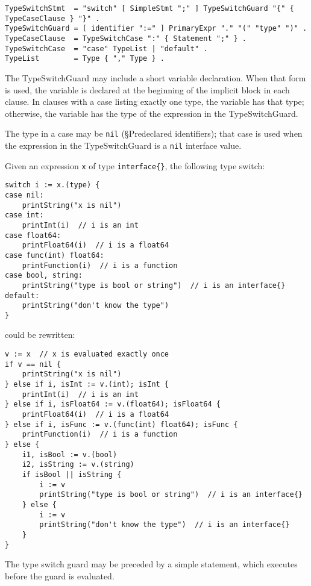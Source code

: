 {\begin{Verbatim}[frame=single]
TypeSwitchStmt  = "switch" [ SimpleStmt ";" ] TypeSwitchGuard "{" { TypeCaseClause } "}" .
TypeSwitchGuard = [ identifier ":=" ] PrimaryExpr "." "(" "type" ")" .
TypeCaseClause  = TypeSwitchCase ":" { Statement ";" } .
TypeSwitchCase  = "case" TypeList | "default" .
TypeList        = Type { "," Type } .
\end{Verbatim}

The TypeSwitchGuard may include a
short variable declaration.
When that form is used, the variable is declared at the beginning of the
implicit block in each clause. In clauses with a case
listing exactly one type, the variable has that type; otherwise, the
variable has the type of the expression in the TypeSwitchGuard.

The type in a case may be \texttt{nil}
(§Predeclared identifiers); that
case is used when the expression in the TypeSwitchGuard is a
\texttt{nil} interface value.

Given an expression \texttt{x} of type \texttt{interface\{\}}, the
following type switch:

\begin{Verbatim}[frame=single]
switch i := x.(type) {
case nil:
    printString("x is nil")
case int:
    printInt(i)  // i is an int
case float64:
    printFloat64(i)  // i is a float64
case func(int) float64:
    printFunction(i)  // i is a function
case bool, string:
    printString("type is bool or string")  // i is an interface{}
default:
    printString("don't know the type")
}
\end{Verbatim}

could be rewritten:

\begin{Verbatim}[frame=single]
v := x  // x is evaluated exactly once
if v == nil {
    printString("x is nil")
} else if i, isInt := v.(int); isInt {
    printInt(i)  // i is an int
} else if i, isFloat64 := v.(float64); isFloat64 {
    printFloat64(i)  // i is a float64
} else if i, isFunc := v.(func(int) float64); isFunc {
    printFunction(i)  // i is a function
} else {
    i1, isBool := v.(bool)
    i2, isString := v.(string)
    if isBool || isString {
        i := v
        printString("type is bool or string")  // i is an interface{}
    } else {
        i := v
        printString("don't know the type")  // i is an interface{}
    }
}
\end{Verbatim}

The type switch guard may be preceded by a simple statement, which
executes before the guard is evaluated.

}
